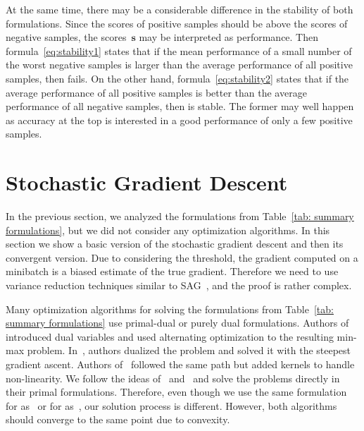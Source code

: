 At the same time, there may be a considerable difference in the stability of both formulations. Since the scores of positive samples should be above the scores of negative samples, the scores~$\bm{s}$ may be interpreted as performance. Then formula~\eqref{eq:stability1} states that if the mean performance of a small number of the worst negative samples is larger than the average performance of all positive samples, then \tauFPL fails. On the other hand, formula~\eqref{eq:stability2} states that if the average performance of all positive samples is better than the average performance of all negative samples, then \PatMatNP is stable. The former may well happen as accuracy at the top is interested in a good performance of only a few positive samples.

\section{Stochastic Gradient Descent}\label{sec:convergence}

In the previous section, we analyzed the formulations from Table~\ref{tab: summary formulations}, but we did not consider any optimization algorithms. In this section we show a basic version of the stochastic gradient descent and then its convergent version. Due to considering the threshold, the gradient computed on a minibatch is a biased estimate of the true gradient. Therefore we need to use variance reduction techniques similar to SAG~\cite{schmidt2017minimizing}, and the proof is rather complex.

Many optimization algorithms for solving the formulations from Table~\ref{tab: summary formulations} use primal-dual or purely dual formulations. Authors of~\cite{eban2017scalable} introduced dual variables and used alternating optimization to the resulting min-max problem. In~\cite{li2014top, zhang2018tau}, authors dualized the problem and solved it with the steepest gradient ascent. Authors of~\cite{macha2020nonlinear} followed the same path but added kernels to handle non-linearity. We follow the ideas of~\cite{mackey2018constrained} and~\cite{adam2019machine} and solve the problems directly in their primal formulations. Therefore, even though we use the same formulation for \TopPush as~\cite{li2014top} or for \tauFPL as~\cite{zhang2018tau}, our solution process is different. However, both algorithms should converge to the same point due to convexity.

